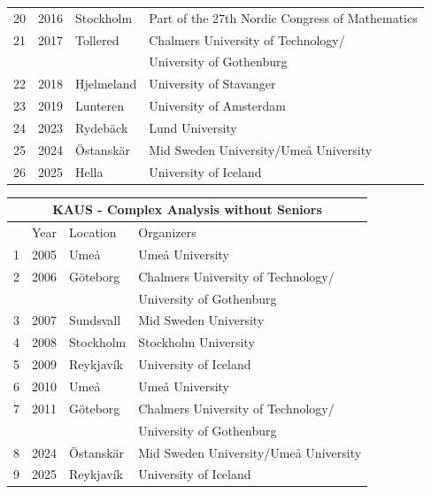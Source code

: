 \documentclass[12pt, openany, twoside]{report}      %
\begin{document}
\begin{center}
\begin{tabular}{llll}
        20 & 2016 & Stockholm & Part of the 27th Nordic Congress of Mathematics\\
        21 & 2017 & Tollered & Chalmers University of Technology/\\
           &      &               & University of Gothenburg\\
        22 & 2018 & Hjelmeland & University of Stavanger\\
        23 & 2019 & Lunteren & University of Amsterdam\\
        24 & 2023 & Rydebäck & Lund University\\
        25 & 2024 & Östanskär & Mid Sweden University/Umeå University\\
        26 & 2025 & Hella & University of Iceland\\
        \bottomrule
    \end{tabular}
\end{center}
    
\begin{center}
    \begin{tabular}{llll}
        \toprule
        \multicolumn{4}{c}{KAUS - Complex Analysis without Seniors}\\
        \midrule
         & Year & Location & Organizers \\
         \midrule
        1 & 2005 & Umeå & Umeå University\\
        2 & 2006 & Göteborg  & Chalmers University of Technology/\\
          &      &               & University of Gothenburg \\
        3 & 2007 & Sundsvall & Mid Sweden University\\
        4 & 2008 & Stockholm & Stockholm University  \\
        5 & 2009 & Reykjavík & University of Iceland\\
        6 & 2010 & Umeå & Umeå University\\
        7 & 2011 & Göteborg & Chalmers University of Technology/\\
           &      &               & University of Gothenburg\\
        8 & 2024 & Östanskär & Mid Sweden University/Umeå University\\
        9 & 2025 & Reykjavík & University of Iceland\\
        \bottomrule
    \end{tabular}
\end{center}
\end{document}
